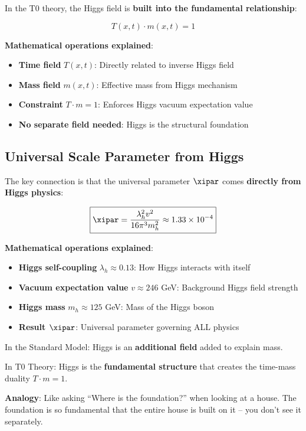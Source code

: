 	In the T0 theory, the Higgs field is \textbf{built into the fundamental relationship}:
	
	\begin{equation}
		\boxed{T(x,t) \cdot m(x,t) = 1}
		\label{eq:higgs_foundation}
	\end{equation}
	
	\textbf{Mathematical operations explained}:
	\begin{itemize}
		\item \textbf{Time field} $T(x,t)$: Directly related to inverse Higgs field
		\item \textbf{Mass field} $m(x,t)$: Effective mass from Higgs mechanism
		\item \textbf{Constraint} $T \cdot m = 1$: Enforces Higgs vacuum expectation value
		\item \textbf{No separate field needed}: Higgs is the structural foundation
	\end{itemize}
	
	\subsection{Universal Scale Parameter from Higgs}
	
	The key connection is that the universal parameter $\xipar$ comes \textbf{directly from Higgs physics}:
	
	\begin{equation}
		\boxed{\xipar = \frac{\lambda_h^2 v^2}{16\pi^3 m_h^2} \approx 1.33 \times 10^{-4}}
		\label{eq:xi_from_higgs}
	\end{equation}
	
	\textbf{Mathematical operations explained}:
	\begin{itemize}
		\item \textbf{Higgs self-coupling} $\lambda_h \approx 0.13$: How Higgs interacts with itself
		\item \textbf{Vacuum expectation value} $v \approx 246$ GeV: Background Higgs field strength
		\item \textbf{Higgs mass} $m_h \approx 125$ GeV: Mass of the Higgs boson
		\item \textbf{Result $\xipar$}: Universal parameter governing ALL physics
	\end{itemize}
	
	\begin{tcolorbox}[colback=purple!5!white,colframe=purple!75!black,title=Higgs Integration in T0 Theory]
		In the Standard Model: Higgs is an \textbf{additional field} added to explain mass.
		
		In T0 Theory: Higgs is the \textbf{fundamental structure} that creates the time-mass duality $T \cdot m = 1$.
		
		\textbf{Analogy}: Like asking ``Where is the foundation?'' when looking at a house. The foundation is so fundamental that the entire house is built on it -- you don't see it separately.
	\end{tcolorbox}
	
